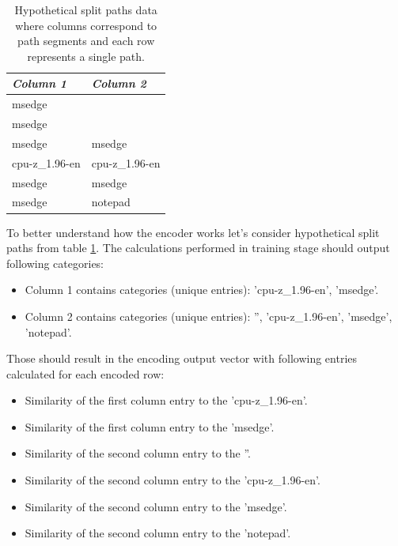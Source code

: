 \documentclass[a4paper,twoside,12pt]{book}
\begin{document}
\begin{table}
	\centering
	\caption{Hypothetical split paths data where columns correspond to path segments and each row represents a single path.}
	\label{id:tab:hypSplitPaths}
	\begin{tabular}{|l|l|}
		\hline
		\textit{\textbf{Column 1}} & \textit{\textbf{Column 2}} \\ \hline
		msedge                     &                            \\ \hline
		msedge                     &                            \\ \hline
		msedge                     & msedge                     \\ \hline
		cpu-z\_1.96-en             & cpu-z\_1.96-en             \\ \hline
		msedge                     & msedge                     \\ \hline
		msedge                     & notepad                    \\ \hline
		\end{tabular}
\end{table}

To better understand how the encoder works let's consider hypothetical split paths from table \ref{id:tab:hypSplitPaths}.
The calculations performed in training stage should output following categories:
\begin{itemize}
	\item Column 1 contains categories (unique entries): 'cpu-z\_1.96-en', 'msedge'.
	\item Column 2 contains categories (unique entries): '', 'cpu-z\_1.96-en', 'msedge', 'notepad'.
\end{itemize}

Those should result in the encoding output vector with following entries calculated for each encoded row:

\begin{itemize}
	\item Similarity of the first column entry to the 'cpu-z\_1.96-en'.
	\item Similarity of the first column entry to the 'msedge'.
	\item Similarity of the second column entry to the ''.
	\item Similarity of the second column entry to the 'cpu-z\_1.96-en'.
	\item Similarity of the second column entry to the 'msedge'.
	\item Similarity of the second column entry to the 'notepad'.
\end{itemize}
\end{document}
